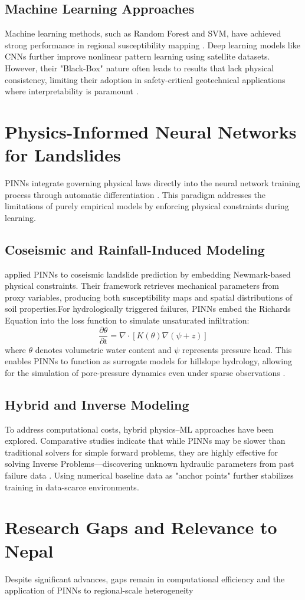 \documentclass[12pt]{report}
\begin{document}
\subsection{Machine Learning Approaches}Machine learning methods, such as Random Forest and SVM, have achieved strong performance in regional susceptibility mapping \citep{chowdhury2024landslide}. Deep learning models like CNNs further improve nonlinear pattern learning using satellite datasets. However, their "Black-Box" nature often leads to results that lack physical consistency, limiting their adoption in safety-critical geotechnical applications where interpretability is paramount \citep{von2021black}.\section{Physics-Informed Neural Networks for Landslides}PINNs integrate governing physical laws directly into the neural network training process through automatic differentiation \citep{raissi2019physics}. This paradigm addresses the limitations of purely empirical models by enforcing physical constraints during learning.\subsection{Coseismic and Rainfall-Induced Modeling}\citet{dahal2024towards} applied PINNs to coseismic landslide prediction by embedding Newmark-based physical constraints. Their framework retrieves mechanical parameters from proxy variables, producing both susceptibility maps and spatial distributions of soil properties.For hydrologically triggered failures, PINNs embed the Richards Equation into the loss function to simulate unsaturated infiltration:\begin{equation}\frac{\partial \theta}{\partial t} = \nabla \cdot \left[ K(\theta) \nabla (\psi + z) \right]\end{equation}where $\theta$ denotes volumetric water content and $\psi$ represents pressure head. This enables PINNs to function as surrogate models for hillslope hydrology, allowing for the simulation of pore-pressure dynamics even under sparse observations \citep{depina2022physics, krkač2023physics}.\subsection{Hybrid and Inverse Modeling}To address computational costs, hybrid physics–ML approaches have been explored. Comparative studies indicate that while PINNs may be slower than traditional solvers for simple forward problems, they are highly effective for solving Inverse Problems—discovering unknown hydraulic parameters from past failure data \citep{wang2025physics, niu2025inverse}. Using numerical baseline data as "anchor points" further stabilizes training in data-scarce environments.\section{Research Gaps and Relevance to Nepal}Despite significant advances, gaps remain in computational efficiency and the application of PINNs to regional-scale heterogeneity 
\end{document}
